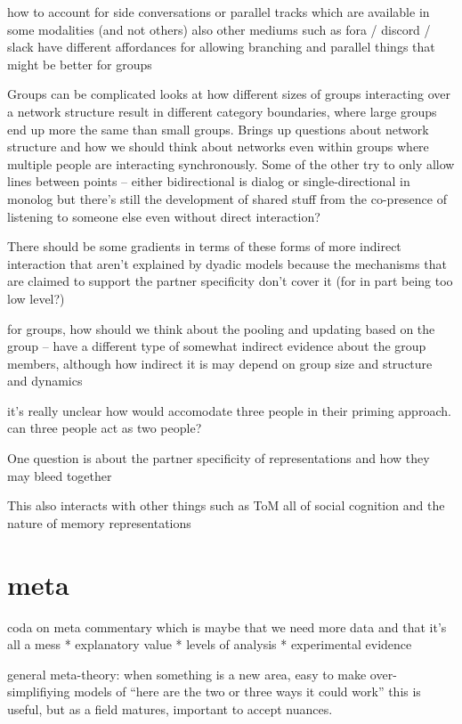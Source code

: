 \documentclass[]{article}
\begin{document}
how to account for side conversations or parallel tracks which are available in some modalities (and not others) also other mediums such as fora / discord / slack have different affordances for allowing branching and parallel things that might be better for groups 

Groups can be complicated \cite{guilbeault2021} looks at how different sizes of groups interacting over a network structure result in different category boundaries, where large groups end up more the same than small groups. Brings up questions about network structure and how we should think about networks even within groups where multiple people are interacting synchronously. Some of the other try to only allow lines between points -- either bidirectional is dialog or single-directional in monolog but there's still the development of shared stuff from the co-presence of listening to someone else even without direct interaction? 

There should be some gradients in terms of these forms of more indirect interaction that aren't explained by dyadic models because the mechanisms that are claimed to support the partner specificity don't cover it (for in part being too low level?)

\cite{hawkins2021} for groups, how should we think about the pooling and updating based on the group -- have a different type of somewhat indirect evidence about the group members, although how indirect it is may depend on group size and structure and dynamics 

it's really unclear how \cite{pickering2004} would accomodate three people in their priming approach. can three people act as two people? 


One question is about the partner specificity of representations and how they may bleed together

This also interacts with other things such as ToM all of social cognition and the nature of memory representations 



\section{meta}
coda on meta commentary which is maybe that we need more data and that it's all a mess 
* explanatory value
* levels of analysis
* experimental evidence

general meta-theory: when something is a new area, easy to make over-simplifiying models of “here are the two or three ways it could work” this is useful, but as a field matures, important to accept nuances.
\end{document}
